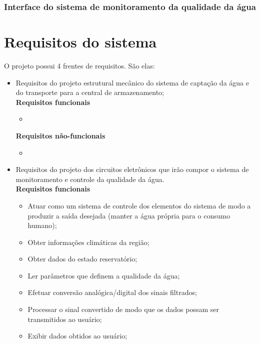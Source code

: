       \subsubsection{Interface do sistema de monitoramento da qualidade da água}
      
      
  \section{Requisitos do sistema}
  
      O projeto possui 4 frentes de requisitos. São elas:
      
      \begin{itemize}
	\item Requisitos do projeto estrutural mecânico do sistema de captação da água e do transporte para a central de armazenamento;\\
	 
	 \textbf{Requisitos funcionais}
	  \begin{itemize}
	   \item 
	  \end{itemize}
	  
	  \textbf{Requisitos não-funcionais}
	  \begin{itemize}
	   \item 
	  \end{itemize}
	  
	\item Requisitos do projeto dos circuitos eletrônicos que irão compor o sistema de monitoramento e controle da qualidade da água.\\
	 
	 \textbf{Requisitos funcionais}
	  \begin{itemize}
	   \item Atuar como um sistema de controle dos elementos do sistema de modo a produzir a saída desejada (manter a água própria para o consumo humano);
	   \item Obter informações climáticas da região;
	   \item Obter dados do estado reservatório;
	   \item Ler parâmetros que definem a qualidade da água;
	   \item Efetuar conversão analógica/digital dos sinais filtrados;
	   \item Processar o sinal convertido de modo que os dados possam ser transmitidos ao usuário;
	   \item Exibir dados obtidos ao usuário;
	  \end{itemize}
	  

\end{itemize}
